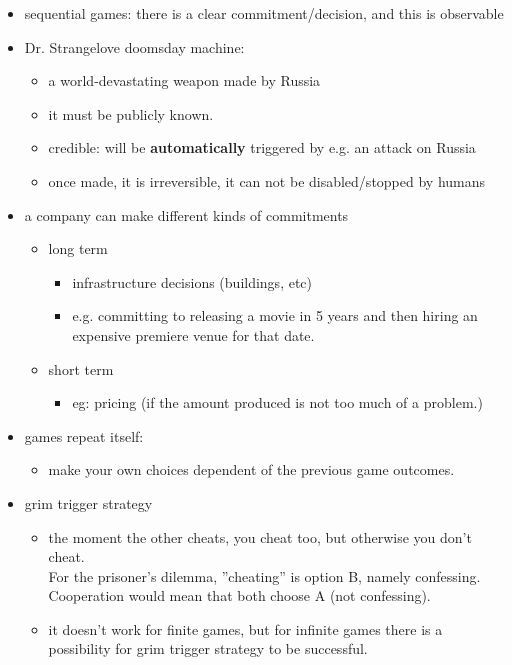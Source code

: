 \documentclass[12pt, a4paper, titlepage]{extarticle}
\begin{document}
    \begin{itemize}
    \item sequential games: there is a clear commitment/decision, and this is observable
    \item Dr. Strangelove doomsday machine:
        \begin{itemize}
            \item a world-devastating weapon made by Russia
            \item it must be publicly known.
            \item credible: will be \textbf{automatically} triggered by e.g. an attack on Russia
            \item once made, it is irreversible, it can not be disabled/stopped by humans
        \end{itemize}
    \item a company can make different kinds of commitments
    \begin{itemize}
        \item long term
        \begin{itemize}
            \item infrastructure decisions (buildings, etc)
            \item e.g. committing to releasing a movie in 5 years and then hiring an expensive premiere venue for that date.
        \end{itemize}
            \item short term
        \begin{itemize}
            \item eg: pricing (if the amount produced is not too much of a problem.)
        \end{itemize}
    \end{itemize}
    \item games repeat itself:
    \begin{itemize}
        \item make your own choices dependent of the previous game outcomes.
    \end{itemize}
    \item grim trigger strategy
    \begin{itemize}
        \item the moment the other cheats, you cheat too, but otherwise you don't cheat. \\ For the prisoner's dilemma, ''cheating'' is option B, namely confessing. Cooperation would mean that both choose A (not confessing).
        \item it doesn't work for finite games, but for infinite games there is a possibility for grim trigger strategy to be successful.

\end{itemize}
\end{itemize}
\end{document}

